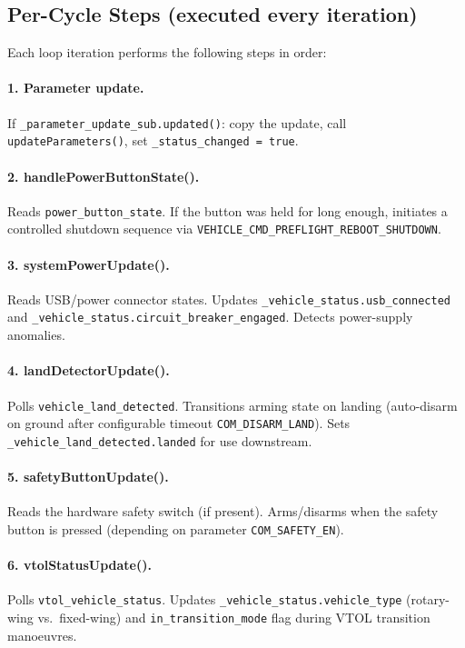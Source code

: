 \documentclass[12pt,a4paper]{article}
\begin{document}
\subsection{Per-Cycle Steps (executed every iteration)}

Each loop iteration performs the following steps in order:

\paragraph{1. Parameter update.}
If \texttt{\_parameter\_update\_sub.updated()}: copy the update, call
\texttt{updateParameters()}, set \texttt{\_status\_changed = true}.

\paragraph{2. handlePowerButtonState().}
Reads \texttt{power\_button\_state}. If the button was held for long enough,
initiates a controlled shutdown sequence via
\texttt{VEHICLE\_CMD\_PREFLIGHT\_REBOOT\_SHUTDOWN}.

\paragraph{3. systemPowerUpdate().}
Reads USB/power connector states. Updates
\texttt{\_vehicle\_status.usb\_connected} and
\texttt{\_vehicle\_status.circuit\_breaker\_engaged}.
Detects power-supply anomalies.

\paragraph{4. landDetectorUpdate().}
Polls \texttt{vehicle\_land\_detected}. Transitions arming state on landing
(auto-disarm on ground after configurable timeout \texttt{COM\_DISARM\_LAND}).
Sets \texttt{\_vehicle\_land\_detected.landed} for use downstream.

\paragraph{5. safetyButtonUpdate().}
Reads the hardware safety switch (if present).
Arms/disarms when the safety button is pressed (depending on parameter
\texttt{COM\_SAFETY\_EN}).

\paragraph{6. vtolStatusUpdate().}
Polls \texttt{vtol\_vehicle\_status}.
Updates \texttt{\_vehicle\_status.vehicle\_type} (rotary-wing vs.\ fixed-wing)
and \texttt{in\_transition\_mode} flag during VTOL transition manoeuvres.
\end{document}
